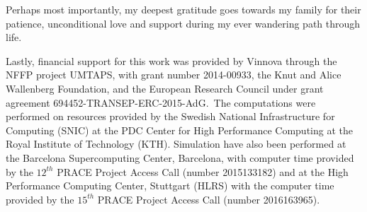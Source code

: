 \begin{acknowledgements}
	Perhaps most importantly, my deepest gratitude goes towards my family for their patience, unconditional love and support during my ever wandering path through life.
	
	Lastly, financial support for this work was provided by Vinnova through the NFFP project UMTAPS, with grant number 2014-00933, the Knut and Alice Wallenberg Foundation, and the European Research Council under grant agreement 694452-TRANSEP-ERC-2015-AdG.\ The computations were performed on resources provided by the Swedish National Infrastructure for Computing (SNIC) at the PDC Center for High Performance Computing at the Royal Institute of Technology (KTH). Simulation have also been performed at the Barcelona Supercomputing Center, Barcelona, with computer time provided by the $12^{th}$ PRACE Project Access Call (number 2015133182) and at the High Performance Computing Center, Stuttgart (HLRS) with the computer time provided by the $15^{th}$ PRACE Project Access Call (number 2016163965). 

\end{acknowledgements}
